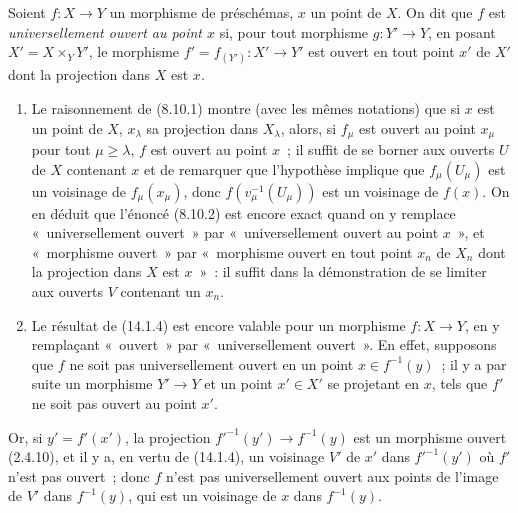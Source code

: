 \begin{definition}[14.3.3]
\label{IV.14.3.3-fr}
Soient $f:X\to Y$ un morphisme de préschémas, $x$ un point de $X$. On dit que $f$
est \emph{universellement ouvert au point $x$} si, pour tout morphisme $g:Y'\to Y$,
en posant $X'=X\times_Y Y'$, le morphisme $f'=f_{(Y')}:X'\to Y'$ est ouvert en
tout point $x'$ de $X'$ dont la projection dans $X$ est $x$.
\end{definition}

\begin{remarks}[14.3.3.1]
\label{IV.14.3.3.1-fr}
\begin{enumerate}[label=(\roman*)]
  \item Le raisonnement de (8.10.1) montre (avec les mêmes notations) que si $x$
  est un point de $X$, $x_\lambda$ sa projection dans $X_\lambda$, alors, si
  $f_\mu$ est ouvert au point $x_\mu$ pour tout $\mu\geq\lambda$, $f$ est ouvert
  au point $x$~; il suffit de se borner aux ouverts $U$ de $X$ contenant $x$ et de
  remarquer que l'hypothèse implique que $f_\mu(U_\mu)$ est un voisinage de
  $f_\mu(x_\mu)$, donc $f(v_\mu^{-1}(U_\mu))$ est un voisinage de $f(x)$. On en
  déduit que l'énoncé (8.10.2) est encore exact quand on y remplace
  «~universellement ouvert~» par «~universellement ouvert au point $x$~», et
  «~morphisme ouvert~» par «~morphisme ouvert en tout point $x_n$ de $X_n$ dont
  la projection dans $X$ est $x$~»~: il suffit dans la démonstration de se limiter
  aux ouverts $V$ contenant un $x_n$.

  \item Le résultat de (14.1.4) est encore valable pour un morphisme $f:X\to Y$,
  en y remplaçant «~ouvert~» par «~universellement ouvert~». En effet, supposons
  que $f$ ne soit pas universellement ouvert en un point $x\in f^{-1}(y)$~; il y a
  par suite un morphisme $Y'\to Y$ et un point $x'\in X'$ se projetant en $x$, tels
  que $f'$ ne soit pas ouvert au point $x'$.
\end{enumerate}
\end{remarks}


Or, si $y'=f'(x')$, la projection $f'^{-1}(y')\to f^{-1}(y)$ est un morphisme
ouvert (2.4.10), et il y a, en vertu de (14.1.4), un voisinage $V'$ de $x'$ dans
$f'^{-1}(y')$ où $f'$ n'est pas ouvert~; donc $f$ n'est pas universellement ouvert
aux points de l'image de $V'$ dans $f^{-1}(y)$, qui est un voisinage de $x$ dans
$f^{-1}(y)$.


